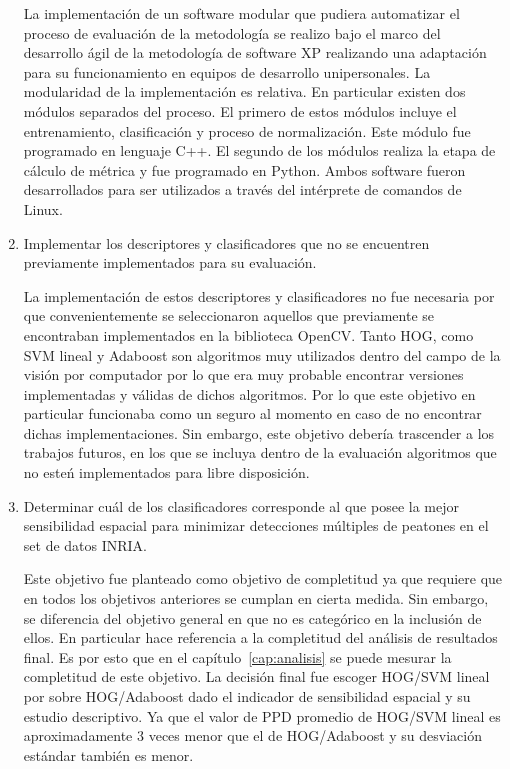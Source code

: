 \begin{enumerate}
La implementación de un software modular que pudiera automatizar el proceso de evaluación de la metodología se realizo bajo el marco del desarrollo ágil de la metodología de software XP realizando una adaptación para su funcionamiento en equipos de desarrollo unipersonales. La modularidad de la implementación es relativa. En particular existen dos módulos separados del proceso. El primero de estos módulos incluye el entrenamiento, clasificación y proceso de normalización. Este módulo fue programado en lenguaje C++. El segundo de los módulos realiza la etapa de cálculo de métrica y fue programado en Python. Ambos software fueron desarrollados para ser utilizados a través del intérprete de comandos de Linux.

\item Implementar los descriptores y clasificadores que no se encuentren previamente implementados para su evaluación.

La implementación de estos descriptores y clasificadores no fue necesaria por que convenientemente se seleccionaron aquellos que previamente se encontraban implementados en la biblioteca OpenCV. Tanto HOG, como SVM lineal y Adaboost son algoritmos muy utilizados dentro del campo de la visión por computador por lo que era muy probable encontrar versiones implementadas y válidas de dichos algoritmos. Por lo que este objetivo en particular funcionaba como un seguro al momento en caso de no encontrar dichas implementaciones. Sin embargo, este objetivo debería trascender a los trabajos futuros, en los que se incluya dentro de la evaluación algoritmos que no esteń implementados para libre disposición. 

\item Determinar cuál de los clasificadores corresponde al que posee la mejor sensibilidad espacial para minimizar detecciones múltiples de peatones en el set de datos INRIA.

Este objetivo fue planteado como objetivo de completitud ya que requiere que en todos los objetivos anteriores se cumplan en cierta medida. Sin embargo, se diferencia del objetivo general en que no es categórico en la inclusión de ellos. En particular hace referencia a la completitud del análisis de resultados final. Es por esto que en el capítulo~\ref{cap:analisis} se puede mesurar la completitud de este objetivo. La decisión final fue escoger HOG/SVM lineal por sobre HOG/Adaboost dado el indicador de sensibilidad espacial y su estudio descriptivo. Ya que el valor de PPD promedio de HOG/SVM lineal es aproximadamente 3 veces menor que el de HOG/Adaboost y su desviación estándar también es menor.

\end{enumerate}


